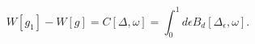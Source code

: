 \begin{equation}   
W[g_1]-W[g]=C[\Delta,\omega]=\int_0^1 d\epsilon 
B_d[\Delta_\epsilon,\omega].
\end{equation}

